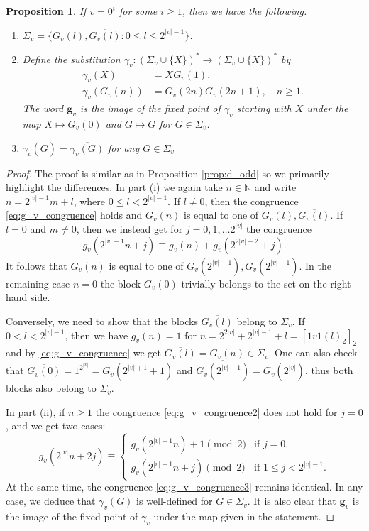 \documentclass[a4paper,11pt]{amsart}
\newtheorem{prop}[thm]{Proposition}
\theoremstyle{definition}
\newcommand{\N}{\mathbb{N}}
\begin{document}
\begin{prop} \label{prop:g_v_substitution2}
If $v = 0^i$ for some $i \geq 1$, then we have the following.
\begin{enumerate}[label={\textup{(\roman*)}}]
\item $\Sigma_v = \{G_v(l), \overline{G_v(l)}: 0 \leq l \leq 2^{|v|-1}\}$.
\item Define the substitution $\gamma_v \colon (\Sigma_v \cup \{X\})^* \to (\Sigma_v \cup \{X\})^*$ by
\begin{align*}
\gamma_v(X)  &= X G_v(1), \\
\gamma_v(G_v(n)) &= G_v(2n) G_v(2n+1), \quad n \geq 1.
\end{align*}
The word $\mathbf{g}_v$ is the image of the fixed point of $\gamma_v$ starting with $X$ under the map $X \mapsto G_v(0)$ and $G \mapsto G$ for $G \in \Sigma_v$.
\item $\gamma_v(\overline{G}) = \overline{\gamma_v(G)}$ for any $G \in \Sigma_v$
\end{enumerate}
\end{prop}
\begin{proof}
The proof is similar as in Proposition \ref{prop:d_odd} so we primarily highlight the differences. In part (i) we again take $n \in \N$ and write $n = 2^{|v|-1} m + l$, where $0 \leq l < 2^{|v|-1}$. If $l \neq 0$, then the congruence \eqref{eq:g_v_congruence} holds and $G_v(n)$ is equal to one of $G_v(l), \overline{G_v(l)}$. If $l = 0$ and $m \neq 0$, then we instead get for $j=0,1,\ldots 2^{|v|}$ the congruence 
$$ g_v(2^{|v|-1}n+j) \equiv g_v(n) + g_v(2^{2|v|-2} + j). $$
It follows that $G_v(n)$ is equal to one of $G_v(2^{|v|-1}), \overline{G_v(2^{|v|-1})}$. In the remaining case $n=0$ the block $G_v(0)$ trivially belongs to the set on the right-hand side.

Conversely, we need to show that the blocks $\overline{G_v(l)}$ belong to $\Sigma_v$. If $0 < l < 2^{|v|-1}$, then we have $g_v(n)=1$ for $n =  2^{2|v|} + 2^{|v|-1} +l = [1v1(l)_2]_2$ and by \eqref{eq:g_v_congruence} we get  $\overline{G_v(l)} = G_v(n) \in \Sigma_v$. One can also check that 
$\overline{G_v(0)} = 1^{2^{|v|}} = G_v(2^{|v|+1}+1)$ and $\overline{G_v(2^{|v|-1})} =  G_v(2^{|v|})$, thus both blocks also belong to $\Sigma_v$.

In part (ii), if $n \geq 1$ the congruence \eqref{eq:g_v_congruence2} does not hold for $j=0$, and we get two cases:
 $$g_v(2^{|v|}n+2j) \equiv 
\begin{cases} 
g_v(2^{|v|-1}n) +1  \pmod{2} &\text{if } j=0, \\
g_v(2^{|v|-1}n+j) \pmod{2} &\text{if } 1 \leq j < 2^{|v|-1}.
\end{cases} $$
At the same time, the congruence \eqref{eq:g_v_congruence3} remains identical. In any case, we deduce that $\gamma_v(G)$ is well-defined for $G \in \Sigma_v$.  It is also clear that $\mathbf{g}_v$ is the image of the fixed point of $\gamma_v$ under the map given in the statement.
\end{proof}
\end{document}

